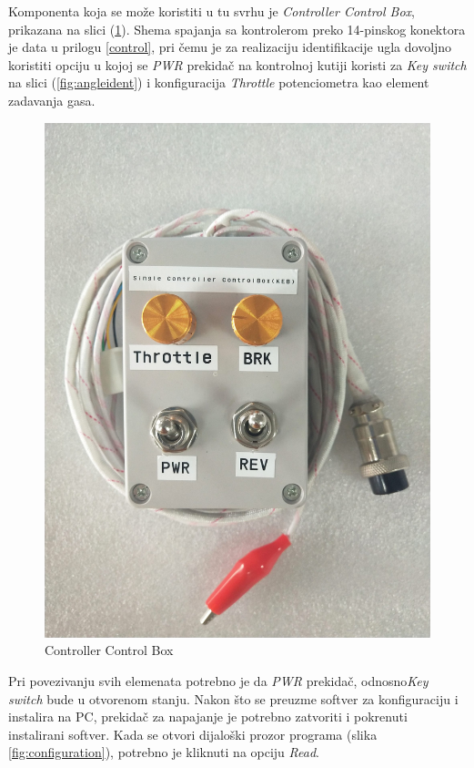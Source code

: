 Komponenta koja se može koristiti u tu svrhu je \textit{Controller Control Box}, prikazana na slici (\ref{fig:controlbox}). Shema spajanja sa kontrolerom preko 14-pinskog konektora je data u prilogu \ref{control}, pri čemu je za realizaciju identifikacije ugla dovoljno koristiti opciju u kojoj se \textit{PWR} prekidač na kontrolnoj kutiji koristi za \textit{Key switch} na slici (\ref{fig:angleident}) i konfiguracija \textit{Throttle} potenciometra kao element zadavanja gasa.

\begin{figure}
\centering
\includegraphics[scale=0.1]{slike/controlbox.jpg}
\caption{Controller Control Box}
\label{fig:controlbox}
\end{figure}

Pri povezivanju svih elemenata potrebno je da \textit{PWR} prekidač, odnosno\textit{Key switch} bude u otvorenom stanju. Nakon što se preuzme softver za konfiguraciju i instalira na PC, prekidač za napajanje je potrebno zatvoriti i pokrenuti instalirani softver. Kada se otvori dijaloški prozor programa (slika \ref{fig:configuration}), potrebno je kliknuti na opciju \textit{Read}.

